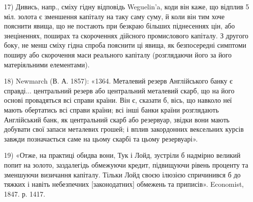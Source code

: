 17) Дивись, напр., сміху гідну відповідь Weguelin’a, коди він каже, що відплив 5 міл. золота
є зменшення капіталу на таку саму суму, й коли він тим хоче пояснити явища, що не постають при
безкраю
більших піднесеннях цін, або знеціненнях, поширах та скороченнях дійсного промислового капіталу.
З другого боку, не менш сміху гідна спроба пояснити ці явища, як безпосередні симптоми поширу або
скорочення маси реального капіталу (розглядаючи його за його матеріяльними елементами).

18) Newmarch (В. А. 1857): «1364. Металевий резерв Англійського банку є справді... центральний
резерв або центральний металевий скарб, що на його основі провадяться всі справи країни.
Він є, сказати б, вісь, що навколо неї мають обертатись всі справи країни; всі інші банки країни
розглядають Англійський банк, як центральний скарб або резервуар, звідки вони мають добувати свої
запаси металевих грошей; і вплив закордонних вексельних курсів завжди позначається саме на цьому
скарбі та цьому резервуарі».

19) «Отже, на практиці обидва вони, Тук і Лойд, зустріли б надмірно великий попит на золото,
заздалегідь обмежуючи кредит, підвищуючи рівень проценту та зменшуючи визичання капіталу. Тільки
Лойд своєю ілюзією спричинився б до тяжких і навіть небезпечних [законодатних] обмежень та
приписів».
Economist, 1847. р. 1417.
